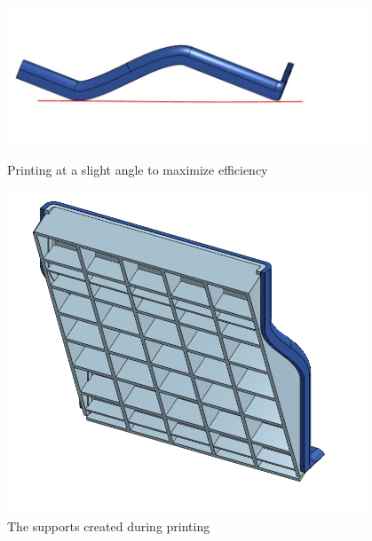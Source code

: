 \begin{figure}[ht]
\centering
\begin{minipage}[b]{.48\textwidth}
  \centering
  \includegraphics[width=0.95\textwidth]{Meetings/November/11-27-21/11-27-21_CAD_Figure3 - Nathan Forrer.JPG}
  \caption{Printing at a slight angle to maximize efficiency}
  \label{fig:pic3}
\end{minipage}%
\hfill%
\begin{minipage}[b]{.48\textwidth}
  \centering
  \includegraphics[width=0.95\textwidth]{Meetings/November/11-27-21/11-22-21_CAD_Figure4 - Nathan Forrer.PNG}
  \caption{The supports created during printing}
  \label{fig:pic4}
\end{minipage}
\end{figure}

